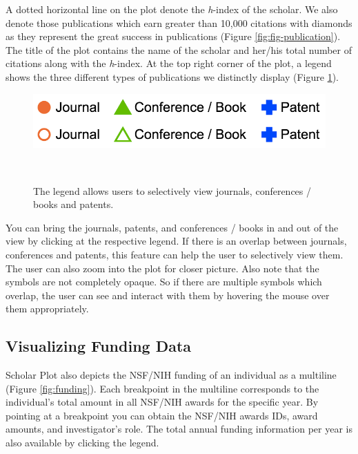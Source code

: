 A dotted horizontal line on the plot denote the {\it h}-index of the scholar. We also denote those publications which earn greater than 10,000 citations with diamonds as they represent the great success in publications (Figure \ref{fig:fig-publication}). The title of the plot contains the name of the scholar and her/his total number of citations along with the {\it h}-index. At the top right corner of the plot, a legend shows the three different types of publications we distinctly display (Figure \ref{fig:fig-legend}).

\begin{figure}[!htb]
\centering
  \includegraphics[width=0.9\columnwidth]{figures/fig_legend-toggle}
  \caption{The legend allows users to selectively view journals, conferences / books and patents.}~\label{fig:fig-legend}
\end{figure}

You can bring the journals, patents, and conferences / books in and out of the view by clicking at the respective legend. If there is an overlap between journals, conferences and patents, this feature can help the user to selectively view them. The user can also zoom into the plot for closer picture. Also note that the symbols are not completely opaque. So if there are multiple symbols which overlap, the user can see and interact with them by hovering the mouse over them appropriately.

\subsection{Visualizing Funding Data}
Scholar Plot also depicts the NSF/NIH funding of an individual as a multiline (Figure \ref{fig:funding}). Each breakpoint in the multiline corresponds to the individual's total amount in all NSF/NIH awards for the specific year. By pointing at a breakpoint you can obtain the NSF/NIH awards IDs, award amounts, and investigator's role. The total annual funding information per year is also available by clicking the legend. 

